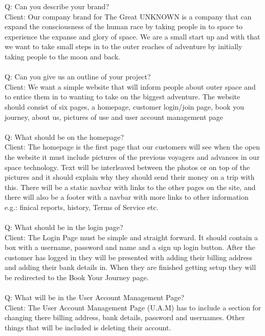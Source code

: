 \documentclass{article}
\begin{document}
Q: Can you describe your brand?
\\
Client: Our company brand for The Great UNKNOWN is a company that can expand the consciousness of the human race by taking people in to space to experience the expanse and glory of space. We are a small start up and with that we want to take small steps in to the outer reaches of adventure by initially taking people to the moon and back. 
\\
\\
Q: Can you give us an outline of your project?
\\
Client: We want a simple website that will inform people about outer space and to entice them in to wanting to take on the biggest adventure. 
The website should consist of six pages, a homepage, customer login/join page, book you journey, about us, pictures of use and user account management page
\\
\\
Q: What should be on the homepage?
\\
Client: The homepage is the first page that our customers will see when the open the website it must include pictures of the previous voyagers and advances in our space technology. Text will be interleaved between the photos or on top of the pictures and it should explain why they should send their money on a trip with this. There will be a static navbar with links to the other pages on the site, and there will also be a footer with a navbar with more links to other information e.g.: finical reports, history, Terms of Service etc.
\\
\\
Q: What should be in the login page?
\\
Client:  The Login Page must be simple and straight forward.  It should contain a box with a username, password and name and a sign up login button. After the customer has logged in they will be presented with adding their billing address and adding their bank details in. When they are finished getting setup they will be redirected to the Book Your Journey page.
\\
\\
Q: What will be in the User Account Management Page?
\\
Client: The User Account Management Page (U.A.M) has to include a section for changing there billing address, bank details, password and usernames. Other things that will be included is deleting their account.
\\
\\
\end{document}
